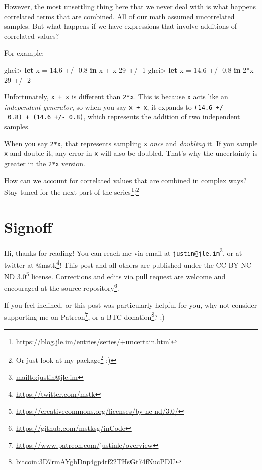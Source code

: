 \documentclass[]{article}
\newenvironment{Shaded}{}{}
\newcommand{\DecValTok}[1]{\textcolor[rgb]{0.25,0.63,0.44}{#1}}
\newcommand{\FloatTok}[1]{\textcolor[rgb]{0.25,0.63,0.44}{#1}}
\newcommand{\KeywordTok}[1]{\textcolor[rgb]{0.00,0.44,0.13}{\textbf{#1}}}
\newcommand{\NormalTok}[1]{#1}
\newcommand{\OperatorTok}[1]{\textcolor[rgb]{0.40,0.40,0.40}{#1}}
\newcommand{\OtherTok}[1]{\textcolor[rgb]{0.00,0.44,0.13}{#1}}
\renewcommand{\href}[2]{#2\footnote{\url{#1}}}
\begin{document}
However, the most unsettling thing here that we never deal with is what happens
correlated terms that are combined. All of our math assumed uncorrelated
samples. But what happens if we have expressions that involve additions of
correlated values?

For example:

\begin{Shaded}
\begin{Highlighting}[]
\NormalTok{ghci}\OperatorTok{\textgreater{}} \KeywordTok{let}\NormalTok{ x }\OtherTok{=} \FloatTok{14.6} \OperatorTok{+/{-}} \FloatTok{0.8} \KeywordTok{in}\NormalTok{ x }\OperatorTok{+}\NormalTok{ x}
\DecValTok{29} \OperatorTok{+/{-}} \DecValTok{1}
\NormalTok{ghci}\OperatorTok{\textgreater{}} \KeywordTok{let}\NormalTok{ x }\OtherTok{=} \FloatTok{14.6} \OperatorTok{+/{-}} \FloatTok{0.8} \KeywordTok{in} \DecValTok{2}\OperatorTok{*}\NormalTok{x}
\DecValTok{29} \OperatorTok{+/{-}} \DecValTok{2}
\end{Highlighting}
\end{Shaded}

Unfortunately, \texttt{x\ +\ x} is different than \texttt{2*x}. This is because
\texttt{x} acts like an \emph{independent generator}, so when you say
\texttt{x\ +\ x}, it expands to \texttt{(14.6\ +/-\ 0.8)\ +\ (14.6\ +/-\ 0.8)},
which represents the addition of two independent samples.

When you say \texttt{2*x}, that represents sampling \texttt{x} \emph{once} and
\emph{doubling} it. If you sample \texttt{x} and double it, any error in
\texttt{x} will also be doubled. That's why the uncertainty is greater in the
\texttt{2*x} version.

How can we account for correlated values that are combined in complex ways? Stay
tuned for the next part of the
\href{https://blog.jle.im/entries/series/+uncertain.html}{series}!\footnote{Or
  just look at my \href{https://hackage.haskell.org/package/uncertain}{package}
  :)}

\section{Signoff}\label{signoff}

Hi, thanks for reading! You can reach me via email at
\href{mailto:justin@jle.im}{\nolinkurl{justin@jle.im}}, or at twitter at
\href{https://twitter.com/mstk}{@mstk}! This post and all others are published
under the \href{https://creativecommons.org/licenses/by-nc-nd/3.0/}{CC-BY-NC-ND
3.0} license. Corrections and edits via pull request are welcome and encouraged
at \href{https://github.com/mstksg/inCode}{the source repository}.

If you feel inclined, or this post was particularly helpful for you, why not
consider \href{https://www.patreon.com/justinle/overview}{supporting me on
Patreon}, or a \href{bitcoin:3D7rmAYgbDnp4gp4rf22THsGt74fNucPDU}{BTC donation}?
:)
\end{document}
